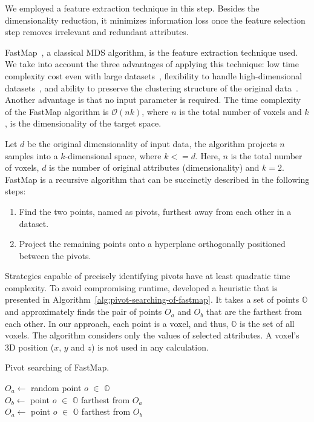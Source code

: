 We employed a feature extraction technique in this step. Besides the dimensionality reduction, it minimizes information loss once the feature selection step removes irrelevant and redundant attributes.

FastMap~\cite{faloutsos1995}, a classical MDS algorithm, is the feature extraction technique used. We take into account the three advantages of applying this technique: low time complexity cost even with large datasets~\cite{faloutsos1995}, flexibility to handle high-dimensional datasets~\cite{faloutsos1995}, and ability to preserve the clustering structure of the original data~\cite{fodor2002, khan2014}. Another advantage is that no input parameter is required. The time complexity of the FastMap algorithm is $\mathcal{O} (nk)$, where $n$ is the total number of voxels and $k$, is the dimensionality of the target space.

Let $d$ be the original dimensionality of input data, the algorithm projects $n$ samples into a $k$-dimensional space, where $k <= d$. Here, $n$ is the total number of voxels, $d$ is the number of original attributes (dimensionality) and $k = 2$. FastMap is a recursive algorithm that can be succinctly described in the following steps:
\begin{enumerate}
    \item Find the two points, named as pivots, furthest away from each other in a dataset.
    \item Project the remaining points onto a hyperplane orthogonally positioned between the pivots.
\end{enumerate} 

Strategies capable of precisely identifying pivots have at least quadratic time complexity. To avoid compromising runtime, \cite{faloutsos1995} developed a heuristic that is presented in Algorithm~\ref{alg:pivot-searching-of-fastmap}. It takes a set of points $\mathbb{O}$ and  approximately finds the pair of points $O_a$ and $O_b$ that are the farthest from each other. In our approach, each point is a voxel, and thus, $\mathbb{O}$ is the set of all voxels. The algorithm considers only the values of selected attributes.  A voxel's 3D position ($x$, $y$ and $z$) is not used in any calculation.

\begin{algorithm}
    \caption{Pivot searching of FastMap.}
    \label{alg:pivot-searching-of-fastmap}
        $O_a \gets$ random point $o$ $\in$ $\mathbb{O}$  \\
        $O_b \gets$ point $o$ $\in$ $\mathbb{O}$ farthest from $O_a$\\
        $O_a \gets$ point $o$ $\in$ $\mathbb{O}$ farthest from $O_b$
\end{algorithm}



